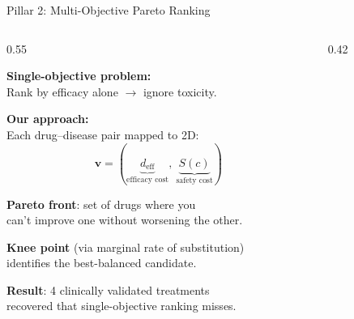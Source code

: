 \documentclass[aspectratio=169,11pt]{beamer}
\begin{document}
\begin{frame}{Pillar 2: Multi-Objective Pareto Ranking}

\begin{columns}[T]
\begin{column}{0.55\textwidth}

\textbf{Single-objective problem:}\\
Rank by efficacy alone $\to$ ignore toxicity.

\vspace{0.8em}

\textbf{Our approach:}\\
Each drug--disease pair mapped to 2D:
\[
\mathbf{v} = (\underbrace{d_{\text{eff}}}_{\text{efficacy cost}},\ \underbrace{S(c)}_{\text{safety cost}})
\]

\textbf{Pareto front}: set of drugs where you\\
can't improve one without worsening the other.

\vspace{0.8em}

\textbf{Knee point} (via marginal rate of substitution)\\
identifies the best-balanced candidate.

\vspace{0.5em}

\textbf{Result}: 4 clinically validated treatments\\
recovered that single-objective ranking misses.

\end{column}

\begin{column}{0.42\textwidth}

\begin{center}
\end{center}
\end{column}
\end{columns}
\end{frame}
\end{document}
